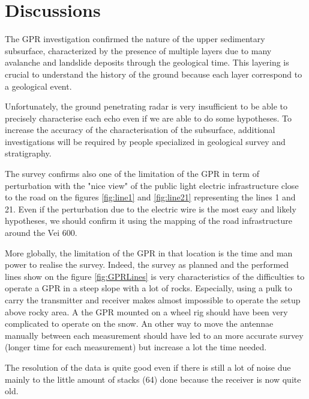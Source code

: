\newpage
\section{Discussions}

The GPR investigation confirmed the nature of the upper sedimentary subsurface, characterized by the presence of multiple layers due to many avalanche and landslide deposits through the geological time. This layering is crucial to understand the history of the ground because each layer correspond to a geological event.

Unfortunately, the ground penetrating radar is very insufficient to be able to precisely characterise each echo even if we are able to do some hypotheses. To increase the accuracy of the characterisation of the subsurface, additional investigations will be required by people specialized in geological survey and stratigraphy.

The survey confirms also one of the limitation of the GPR in term of perturbation with the "nice view" of the public light electric infrastructure close to the road on the figures \ref{fig:line1} and \ref{fig:line21} representing the lines 1 and 21. Even if the perturbation due to the electric wire is the most easy and likely hypotheses, we should confirm it using the mapping of the road infrastructure around the Vei 600.

More globally, the limitation of the GPR in that location is the time and man power to realise the survey. Indeed, the survey as planned and the performed lines show on the figure \ref{fig:GPRLines} is very characteristics of the difficulties to operate a GPR in a steep slope with a lot of rocks. Especially, using a pulk to carry the transmitter and receiver makes almost impossible to operate the setup above rocky area. A the GPR mounted on a wheel rig should have been very complicated to operate on the snow. An other way to move the antennae manually between each measurement should have led to an more accurate survey (longer time for each measurement) but increase a lot the time needed.

The resolution of the data is quite good even if there is still a lot of noise due mainly to the little amount of stacks (64) done because the receiver is now quite old.